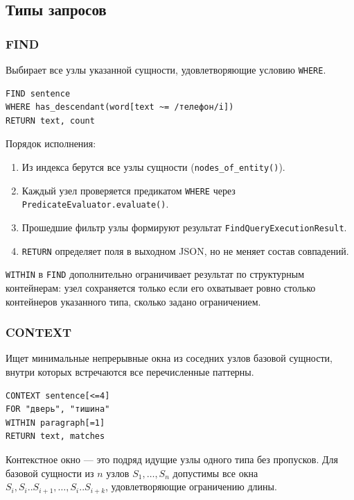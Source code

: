 \documentclass[a4paper,12pt]{article}
\begin{document}
\subsection{Типы запросов}

\subsubsection{FIND}

Выбирает все узлы указанной сущности, удовлетворяющие условию \texttt{WHERE}.

\begin{lstlisting}[language=DiGrDSL]
FIND sentence
WHERE has_descendant(word[text ~= /телефон/i])
RETURN text, count
\end{lstlisting}

Порядок исполнения:
\begin{enumerate}
  \item Из индекса берутся все узлы сущности (\texttt{nodes\_of\_entity()}).
  \item Каждый узел проверяется предикатом \texttt{WHERE} через \texttt{PredicateEvaluator.evaluate()}.
  \item Прошедшие фильтр узлы формируют результат \texttt{FindQueryExecutionResult}.
  \item \texttt{RETURN} определяет поля в выходном JSON, но не меняет состав совпадений.
\end{enumerate}

\texttt{WITHIN} в \texttt{FIND} дополнительно ограничивает результат по структурным контейнерам: узел сохраняется только если его охватывает ровно столько контейнеров указанного типа, сколько задано ограничением.

\subsubsection{CONTEXT}

Ищет минимальные непрерывные окна из соседних узлов базовой сущности, внутри которых встречаются все перечисленные паттерны.

\begin{lstlisting}[language=DiGrDSL]
CONTEXT sentence[<=4]
FOR "дверь", "тишина"
WITHIN paragraph[=1]
RETURN text, matches
\end{lstlisting}

Контекстное окно --- это подряд идущие узлы одного типа без пропусков. Для базовой сущности из $n$ узлов $S_1, \ldots, S_n$ допустимы все окна $S_i, S_i..S_{i+1}, \ldots, S_i..S_{i+k}$, удовлетворяющие ограничению длины.
\end{document}
